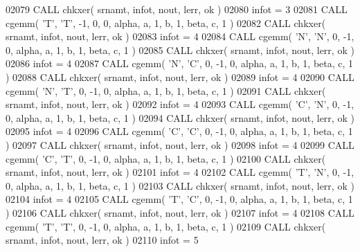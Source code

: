 \begin{DoxyCode}
02079       \textcolor{keyword}{CALL }chkxer( srnamt, infot, nout, lerr, ok )
02080       infot = 3
02081       \textcolor{keyword}{CALL }cgemm( \textcolor{stringliteral}{'T'}, \textcolor{stringliteral}{'T'}, -1, 0, 0, alpha, a, 1, b, 1, beta, c, 1 )
02082       \textcolor{keyword}{CALL }chkxer( srnamt, infot, nout, lerr, ok )
02083       infot = 4
02084       \textcolor{keyword}{CALL }cgemm( \textcolor{stringliteral}{'N'}, \textcolor{stringliteral}{'N'}, 0, -1, 0, alpha, a, 1, b, 1, beta, c, 1 )
02085       \textcolor{keyword}{CALL }chkxer( srnamt, infot, nout, lerr, ok )
02086       infot = 4
02087       \textcolor{keyword}{CALL }cgemm( \textcolor{stringliteral}{'N'}, \textcolor{stringliteral}{'C'}, 0, -1, 0, alpha, a, 1, b, 1, beta, c, 1 )
02088       \textcolor{keyword}{CALL }chkxer( srnamt, infot, nout, lerr, ok )
02089       infot = 4
02090       \textcolor{keyword}{CALL }cgemm( \textcolor{stringliteral}{'N'}, \textcolor{stringliteral}{'T'}, 0, -1, 0, alpha, a, 1, b, 1, beta, c, 1 )
02091       \textcolor{keyword}{CALL }chkxer( srnamt, infot, nout, lerr, ok )
02092       infot = 4
02093       \textcolor{keyword}{CALL }cgemm( \textcolor{stringliteral}{'C'}, \textcolor{stringliteral}{'N'}, 0, -1, 0, alpha, a, 1, b, 1, beta, c, 1 )
02094       \textcolor{keyword}{CALL }chkxer( srnamt, infot, nout, lerr, ok )
02095       infot = 4
02096       \textcolor{keyword}{CALL }cgemm( \textcolor{stringliteral}{'C'}, \textcolor{stringliteral}{'C'}, 0, -1, 0, alpha, a, 1, b, 1, beta, c, 1 )
02097       \textcolor{keyword}{CALL }chkxer( srnamt, infot, nout, lerr, ok )
02098       infot = 4
02099       \textcolor{keyword}{CALL }cgemm( \textcolor{stringliteral}{'C'}, \textcolor{stringliteral}{'T'}, 0, -1, 0, alpha, a, 1, b, 1, beta, c, 1 )
02100       \textcolor{keyword}{CALL }chkxer( srnamt, infot, nout, lerr, ok )
02101       infot = 4
02102       \textcolor{keyword}{CALL }cgemm( \textcolor{stringliteral}{'T'}, \textcolor{stringliteral}{'N'}, 0, -1, 0, alpha, a, 1, b, 1, beta, c, 1 )
02103       \textcolor{keyword}{CALL }chkxer( srnamt, infot, nout, lerr, ok )
02104       infot = 4
02105       \textcolor{keyword}{CALL }cgemm( \textcolor{stringliteral}{'T'}, \textcolor{stringliteral}{'C'}, 0, -1, 0, alpha, a, 1, b, 1, beta, c, 1 )
02106       \textcolor{keyword}{CALL }chkxer( srnamt, infot, nout, lerr, ok )
02107       infot = 4
02108       \textcolor{keyword}{CALL }cgemm( \textcolor{stringliteral}{'T'}, \textcolor{stringliteral}{'T'}, 0, -1, 0, alpha, a, 1, b, 1, beta, c, 1 )
02109       \textcolor{keyword}{CALL }chkxer( srnamt, infot, nout, lerr, ok )
02110       infot = 5

\end{DoxyCode}
